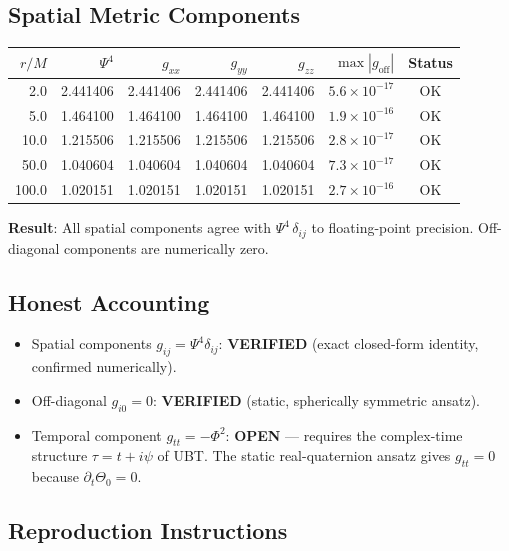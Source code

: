 \documentclass[12pt,a4paper]{article}
\theoremstyle{definition}
\theoremstyle{remark}
\begin{document}
\subsection{Spatial Metric Components}

\begin{center}
\begin{tabular}{rrrrrrc}
\toprule
$r/M$ & $\Psi^4$ & $g_{xx}$ & $g_{yy}$ & $g_{zz}$ & $\max|g_\mathrm{off}|$ & Status \\
\midrule
2.0 & 2.441406 & 2.441406 & 2.441406 & 2.441406 & $5.6\times10^{-17}$ & OK \\
5.0 & 1.464100 & 1.464100 & 1.464100 & 1.464100 & $1.9\times10^{-16}$ & OK \\
10.0 & 1.215506 & 1.215506 & 1.215506 & 1.215506 & $2.8\times10^{-17}$ & OK \\
50.0 & 1.040604 & 1.040604 & 1.040604 & 1.040604 & $7.3\times10^{-17}$ & OK \\
100.0 & 1.020151 & 1.020151 & 1.020151 & 1.020151 & $2.7\times10^{-16}$ & OK \\
\bottomrule
\end{tabular}
\end{center}

\textbf{Result}: All spatial components agree with $\Psi^4\,\delta_{ij}$
to floating-point precision.  Off-diagonal components are numerically zero.

\subsection{Honest Accounting}

\begin{itemize}
  \item Spatial components $g_{ij}=\Psi^4\delta_{ij}$: \textbf{VERIFIED}
        (exact closed-form identity, confirmed numerically).
  \item Off-diagonal $g_{i0}=0$: \textbf{VERIFIED}
        (static, spherically symmetric ansatz).
  \item Temporal component $g_{tt}=-\Phi^2$: \textbf{OPEN}
        — requires the complex-time structure $\tau=t+i\psi$ of UBT.
        The static real-quaternion ansatz gives $g_{tt}=0$ because
        $\partial_t\Theta_0=0$.
\end{itemize}

\subsection{Reproduction Instructions}
\end{document}
